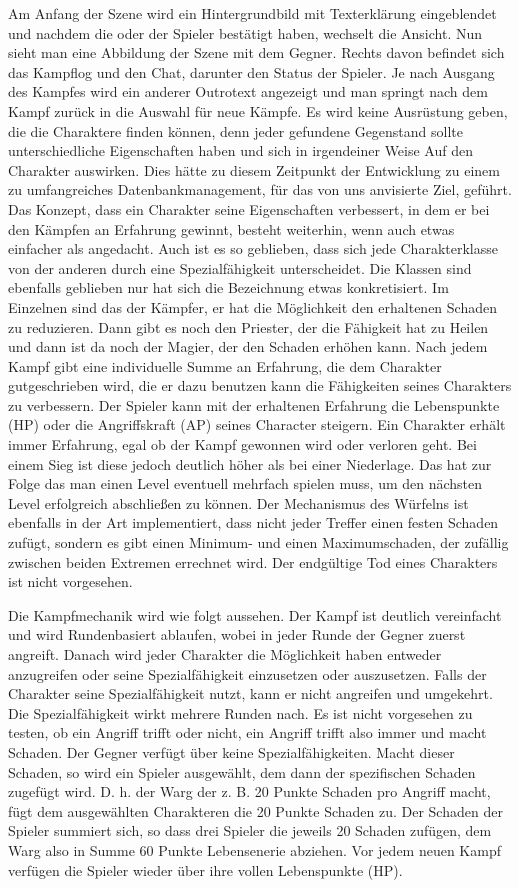 Am Anfang der Szene wird ein Hintergrundbild mit Texterklärung eingeblendet und nachdem die oder der Spieler bestätigt haben, wechselt die Ansicht. Nun sieht man eine Abbildung der Szene mit dem Gegner. Rechts davon befindet sich das Kampflog und den Chat, darunter den Status der Spieler. Je nach Ausgang des Kampfes wird ein anderer Outrotext angezeigt und man springt nach dem Kampf zurück in die Auswahl für neue Kämpfe. Es wird keine Ausrüstung geben, die die Charaktere finden können, denn jeder gefundene Gegenstand sollte unterschiedliche Eigenschaften haben und sich in irgendeiner Weise Auf den Charakter auswirken. Dies hätte zu diesem Zeitpunkt der Entwicklung zu einem zu umfangreiches Datenbankmanagement, für das von uns anvisierte Ziel, geführt. Das Konzept, dass ein Charakter seine Eigenschaften verbessert, in dem er bei den Kämpfen an Erfahrung gewinnt, besteht weiterhin, wenn auch etwas einfacher als angedacht. Auch ist es so geblieben, dass sich jede Charakterklasse von der anderen durch eine Spezialfähigkeit unterscheidet. Die Klassen sind ebenfalls geblieben nur hat sich die Bezeichnung etwas konkretisiert. Im Einzelnen sind das der Kämpfer, er hat die Möglichkeit den erhaltenen Schaden zu reduzieren. Dann gibt es noch den Priester, der die Fähigkeit hat zu Heilen und dann ist da noch der Magier, der den Schaden erhöhen kann. Nach jedem Kampf gibt eine individuelle Summe an Erfahrung, die dem Charakter gutgeschrieben wird, die er dazu benutzen kann die Fähigkeiten seines Charakters zu verbessern. Der Spieler kann mit der erhaltenen Erfahrung die Lebenspunkte (HP) oder die Angriffskraft (AP) seines Character steigern. Ein Charakter erhält immer Erfahrung, egal ob der Kampf gewonnen wird oder verloren geht. Bei einem Sieg ist diese jedoch deutlich höher als bei einer Niederlage. Das hat zur Folge das man einen Level eventuell mehrfach spielen muss, um den nächsten Level erfolgreich abschließen zu können. Der Mechanismus des Würfelns ist ebenfalls in der Art implementiert, dass nicht jeder Treffer einen festen Schaden zufügt, sondern es gibt einen Minimum- und einen Maximumschaden, der zufällig zwischen beiden Extremen errechnet wird. Der endgültige Tod eines Charakters ist nicht vorgesehen. 

Die Kampfmechanik wird wie folgt aussehen. Der Kampf ist deutlich vereinfacht und wird Rundenbasiert ablaufen, wobei in jeder Runde der Gegner zuerst angreift. Danach wird jeder Charakter die Möglichkeit haben entweder anzugreifen oder seine Spezialfähigkeit einzusetzen oder auszusetzen. Falls der Charakter seine Spezialfähigkeit nutzt, kann er nicht angreifen und umgekehrt. Die Spezialfähigkeit wirkt mehrere Runden nach. Es ist nicht vorgesehen zu testen, ob ein Angriff trifft oder nicht, ein Angriff trifft also immer und macht Schaden. Der Gegner verfügt über keine Spezialfähigkeiten. Macht dieser Schaden, so wird ein Spieler ausgewählt, dem dann der spezifischen Schaden zugefügt wird. D. h. der Warg der z. B. 20 Punkte Schaden pro Angriff macht, fügt dem ausgewählten Charakteren die 20 Punkte Schaden zu. Der Schaden der Spieler summiert sich, so dass drei Spieler die jeweils 20 Schaden zufügen, dem Warg also in Summe 60 Punkte Lebensenerie abziehen. Vor jedem neuen Kampf verfügen die Spieler wieder über ihre vollen Lebenspunkte (HP).

